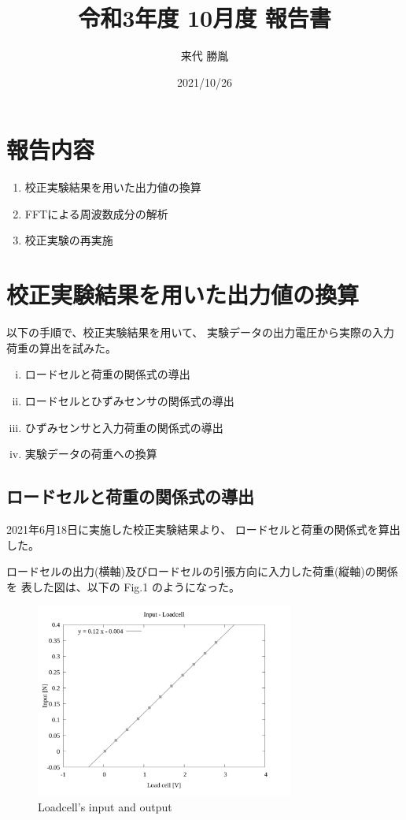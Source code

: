 \documentclass[twocolumn,a4j]{jsarticle}
\author{来代 勝胤}
\title{令和3年度 10月度 報告書}
\date{2021/10/26}
\begin{document}
\columnseprule=0.1mm

\maketitle
\section*{報告内容}
\begin{enumerate}[1.]
    \item 校正実験結果を用いた出力値の換算
    \item FFTによる周波数成分の解析
    \item 校正実験の再実施
\end{enumerate}

\section{校正実験結果を用いた出力値の換算}
以下の手順で、校正実験結果を用いて、
実験データの出力電圧から実際の入力荷重の算出を試みた。
\begin{enumerate}[(i)]
    \item ロードセルと荷重の関係式の導出
    \item ロードセルとひずみセンサの関係式の導出
    \item ひずみセンサと入力荷重の関係式の導出
    \item 実験データの荷重への換算
\end{enumerate}
\subsection{ロードセルと荷重の関係式の導出}
2021年6月18日に実施した校正実験結果より、
ロードセルと荷重の関係式を算出した。\par
ロードセルの出力(横軸)及びロードセルの引張方向に入力した荷重(縦軸)の関係を
表した図は、以下の Fig.1 のようになった。
\begin{figure}[htbp]
    \footnotesize
    \begin{center}
        \includegraphics[width=85mm]{../images/02_force&line.png}
        \caption{Loadcell's input and output}
    \end{center}
\end{figure}
\end{document}
